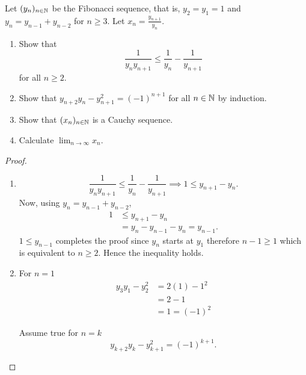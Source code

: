 \documentclass[10pt, a4paper]{article}
\begin{document}
\begin{example}
    Let $(y_n)_{n \in \mathbb{N}}$ be the Fibonacci sequence, that is, $y_2 = y_1 = 1$ and $y_n = y_{n - 1} + y_{n - 2}$ for $n \geq 3$. Let $x_n = \frac{y_{n + 1}}{y_n}$.
    \begin{enumerate}[label = \alph*.]
        \item Show that
        \[
        \frac{1}{y_n y_{n + 1}} \leq \frac{1}{y_n} - \frac{1}{y_{n + 1}}
        \]
        for all $n \geq 2$.
        \item Show that $y_{n + 2}y_n - y_{n + 1}^2 = (-1)^{n + 1}$ for all $n \in \mathbb{N}$ by induction.
        \item Show that $(x_n)_{n \in \mathbb{N}}$ is a Cauchy sequence.
        \item Calculate $\lim_{n \rightarrow \infty}x_n$.
    \end{enumerate}

    \begin{proof}
        \begin{enumerate}[label = \alph*.]
        \item
            \[
            \frac{1}{y_n y_{n + 1}} \leq \frac{1}{y_n} - \frac{1}{y_{n + 1}} \implies 1 \leq y_{n + 1} - y_n.
            \]
            Now, using $y_n = y_{n - 1} + y_{n - 2}$,
            \begin{align*}
                1 &\leq y_{n + 1} - y_n \\
                &= y_n - y_{n - 1} - y_n = y_{n - 1}.
            \end{align*}
            $1 \leq y_{n - 1}$ completes the proof since $y_n$ starts at $y_1$ therefore $n - 1 \geq 1$ which is equivalent to $n \geq 2$. Hence the inequality holds.
            \item
                For $n = 1$
                \begin{align*} 
                    y_3 y_1 - y_2 ^ 2 &= 2(1) - 1 ^ 2 \\
                    &= 2 - 1 \\
                    &= 1 = (-1) ^ 2
                \end{align*}

                Assume true for $n = k$
                \[
                y_{k + 2}y_k - y_{k + 1} ^ 2 = (-1)^{k + 1}.
                \]


\end{enumerate}
\end{proof}
\end{example}
\end{document}
